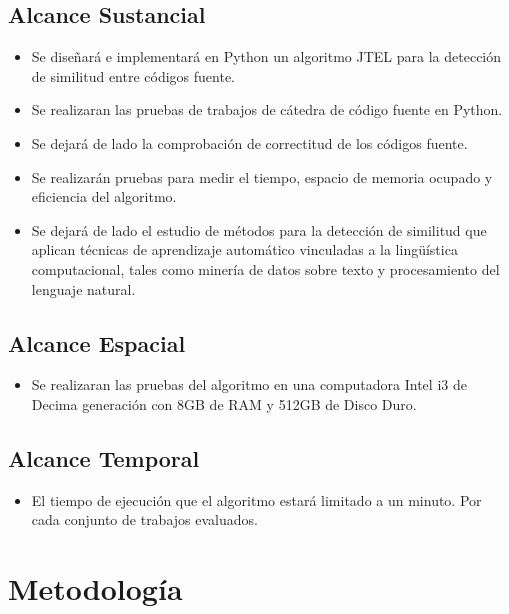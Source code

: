 \subsection{Alcance Sustancial}
\begin{itemize}
    \item Se diseñará e implementará en Python un algoritmo JTEL para la detección de similitud entre códigos fuente.
    \item Se realizaran las pruebas de trabajos de cátedra de código fuente en Python.
    \item Se dejará de lado la comprobación de correctitud de los códigos fuente.
    \item Se realizarán pruebas para medir el tiempo, espacio de memoria ocupado y eficiencia del algoritmo.
    \item Se dejará de lado el estudio de métodos para la detección de similitud que aplican técnicas de aprendizaje automático vinculadas a la lingüística computacional, tales como minería de datos sobre texto y procesamiento del lenguaje natural.
\end{itemize}
\subsection{Alcance Espacial}
\begin{itemize}
    \item Se realizaran las pruebas del algoritmo en una computadora Intel i3 de Decima generación con 8GB de RAM y 512GB de Disco Duro.
\end{itemize}
\subsection{Alcance Temporal}
\begin{itemize}
    \item El tiempo de ejecución que el algoritmo estará limitado a un minuto. Por cada conjunto de trabajos evaluados.
\end{itemize}
\section{Metodología}
